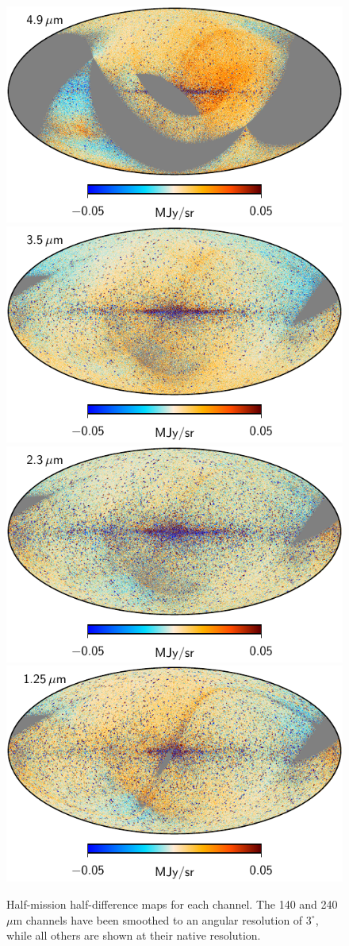 \documentclass{aa}
\begin{document}
\begin{figure}
        \includegraphics[width=0.39\linewidth]{figs/dirbe_04_hmhd_v1.pdf}         
        \includegraphics[width=0.39\linewidth]{figs/dirbe_03_hmhd_v1.pdf}\\
       	\includegraphics[width=0.39\linewidth]{figs/dirbe_02_hmhd_v1.pdf}
       	\includegraphics[width=0.39\linewidth]{figs/dirbe_01_hmhd_v1.pdf}       
       	\caption{Half-mission half-difference maps for each channel. The 140 and 240\,$\mu$m channels have been smoothed to an angular resolution of $3^{\circ}$, while all others are shown at their native resolution. }
       	\label{fig:hmhd}
       \end{figure}
       
\end{document}
